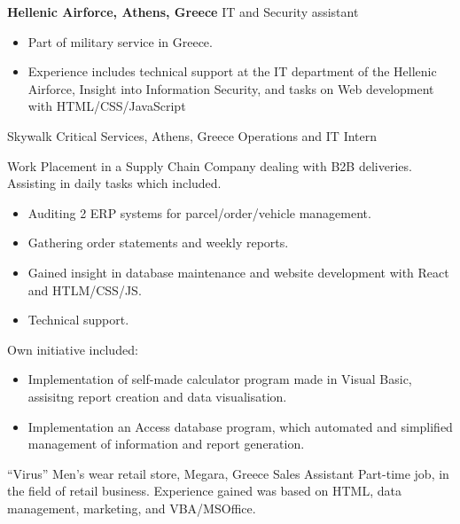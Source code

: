 {\textbf{Hellenic Airforce, Athens, Greece}}
{IT and Security assistant}
{
    \begin{itemize}
        \item Part of military service in Greece.
        \item Experience includes technical support at the IT department of the Hellenic Airforce, Insight into Information Security, and tasks on Web development with HTML/CSS/JavaScript
    \end{itemize}
}

{Skywalk Critical Services, Athens, Greece }
{Operations and IT Intern}
{
    Work Placement in a Supply Chain Company dealing with B2B deliveries. Assisting in daily tasks which included.
    \begin{itemize}
        \item Auditing 2 ERP systems for parcel/order/vehicle management.
        \item Gathering order statements and weekly reports.
        \item Gained insight in database maintenance and website development with React and HTLM/CSS/JS.
        \item Technical support.
    \end{itemize}
    Own initiative included:
    \begin{itemize}
        \item Implementation of self-made calculator program made in Visual Basic, assisitng report creation and data visualisation.
        \item Implementation an Access database program, which automated and simplified management of information and report generation.
    \end{itemize}
}

{“Virus” Men’s wear retail store, Megara, Greece}
{Sales Assistant}
{
    Part-time job, in the field of retail business. Experience gained was based on HTML, data management, marketing, and VBA/MSOffice.
}
